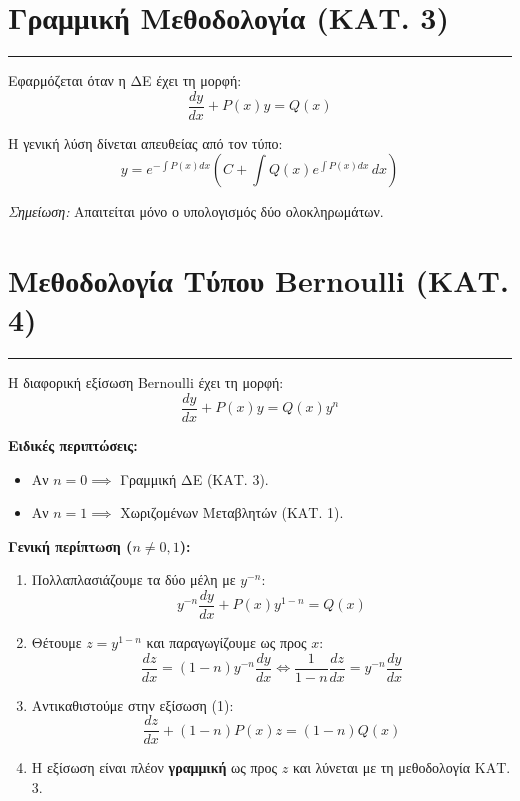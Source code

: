 \documentclass[12pt,a4paper]{article}
\begin{document}
\section*{Γραμμική Μεθοδολογία (ΚΑΤ. 3)}
\vspace{-1em}
\hrule
\vspace{1em}

Εφαρμόζεται όταν η ΔΕ έχει τη μορφή:
\[
\frac{dy}{dx} + P(x)y = Q(x)
\]

Η γενική λύση δίνεται απευθείας από τον τύπο:
\[
y = e^{-\int P(x)dx} \left( C + \int Q(x) e^{\int P(x)dx} \, dx \right)
\]

\textit{Σημείωση:} Απαιτείται μόνο ο υπολογισμός δύο ολοκληρωμάτων.

\section*{Μεθοδολογία Τύπου Bernoulli (ΚΑΤ. 4)}
\vspace{-1em}
\hrule
\vspace{1em}

Η διαφορική εξίσωση Bernoulli έχει τη μορφή:
\[
\frac{dy}{dx} + P(x)y = Q(x)y^n
\]

\textbf{Ειδικές περιπτώσεις:}
\begin{itemize}
    \item Αν $n = 0 \implies$ Γραμμική ΔΕ (ΚΑΤ. 3).
    \item Αν $n = 1 \implies$ Χωριζομένων Μεταβλητών (ΚΑΤ. 1).
\end{itemize}

\textbf{Γενική περίπτωση ($n \neq 0, 1$):}
\begin{enumerate}[leftmargin=*]
    \item Πολλαπλασιάζουμε τα δύο μέλη με $y^{-n}$:
    \begin{equation}
    y^{-n} \frac{dy}{dx} + P(x) y^{1-n} = Q(x)
    \end{equation}
    
    \item Θέτουμε $z = y^{1-n}$ και παραγωγίζουμε ως προς $x$:
    \[
    \frac{dz}{dx} = (1-n) y^{-n} \frac{dy}{dx} \iff \frac{1}{1-n} \frac{dz}{dx} = y^{-n} \frac{dy}{dx}
    \]
    
    \item Αντικαθιστούμε στην εξίσωση (1):
    \[
    \frac{dz}{dx} + (1-n)P(x)z = (1-n)Q(x)
    \]
    \item Η εξίσωση είναι πλέον \textbf{γραμμική} ως προς $z$ και λύνεται με τη μεθοδολογία ΚΑΤ. 3.
\end{enumerate}
\end{document}
